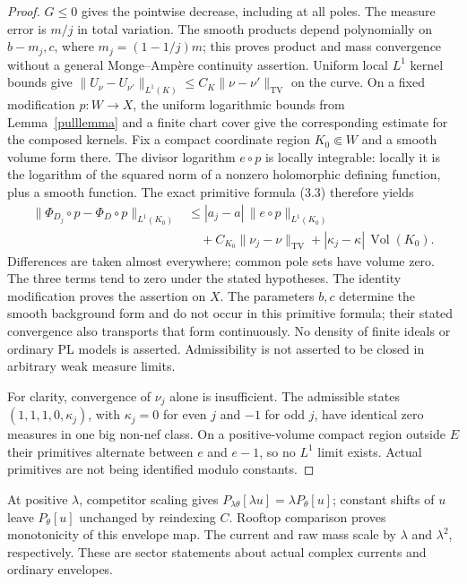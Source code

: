 \documentclass[11pt]{article}
\theoremstyle{remark}\newtheorem{remark}[theorem]{Remark}
\newcommand{\TV}{\operatorname{TV}}
\begin{document}
\begin{proof}
$G\leq0$ gives the pointwise decrease, including at all poles.
The measure error is $m/j$ in total variation. The smooth products
depend polynomially on $b-m_j,c$, where $m_j=(1-1/j)m$;
this proves product and mass convergence without a general
Monge--Amp\`ere continuity assertion.
Uniform local $L^1$ kernel bounds give
$\|U_\nu-U_{\nu'}\|_{L^1(K)}\leq C_K\|\nu-\nu'\|_{\TV}$
on the curve. On a fixed modification $p:W\to X$, the uniform
logarithmic bounds from Lemma~\ref{pulllemma} and a finite chart
cover give the corresponding estimate for the composed kernels.
Fix a compact coordinate region $K_0\Subset W$ and a smooth
volume form there. The divisor logarithm $e\circ p$ is locally
integrable: locally it is the logarithm of the squared norm of a
nonzero holomorphic defining function, plus a smooth function.
The exact primitive formula (3.3) therefore yields
\[
\begin{split}
 \|\Phi_{D_j}\circ p-\Phi_D\circ p\|_{L^1(K_0)}
 &\leq |a_j-a|\,\|e\circ p\|_{L^1(K_0)}\\
 &\quad+C_{K_0}\|\nu_j-\nu\|_{\TV}
       +|\kappa_j-\kappa|\,\operatorname{Vol}(K_0).
\end{split}
\]
Differences are taken almost everywhere; common pole sets have
volume zero. The three terms tend to zero under the stated
hypotheses. The identity modification proves the assertion on $X$.
The parameters $b,c$ determine the smooth background form and
do not occur in this primitive formula; their stated convergence
also transports that form continuously. No density of finite
ideals or ordinary PL models is asserted. Admissibility is not
asserted to be closed in arbitrary weak measure limits.

For clarity, convergence of $\nu_j$ alone is insufficient.
The admissible states $(1,1,1,0,\kappa_j)$, with $\kappa_j=0$
for even $j$ and $-1$ for odd $j$, have identical zero measures
in one big non-nef class. On a positive-volume compact region
outside $E$ their primitives alternate between $e$ and $e-1$,
so no $L^1$ limit exists. Actual primitives are not being
identified modulo constants.
\end{proof}

At positive $\lambda$, competitor scaling gives
$P_{\lambda\theta}[\lambda u]=\lambda P_\theta[u]$;
constant shifts of $u$ leave $P_\theta[u]$ unchanged by reindexing
$C$. Rooftop comparison proves monotonicity of this envelope
map. The current and raw mass scale by $\lambda$ and $\lambda^2$,
respectively. These are sector statements about actual complex
currents and ordinary envelopes.
\end{document}
